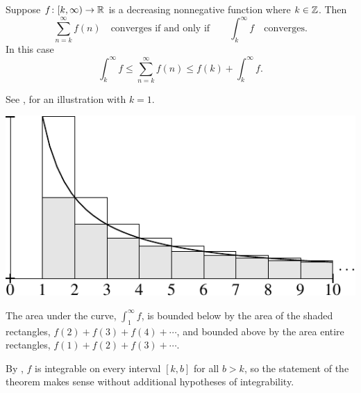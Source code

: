 \begin{prop}
Suppose $f \colon [k,\infty) \to {\mathbb{R}}$ is a decreasing nonnegative
function where $k \in {\mathbb{Z}}$.  Then
\begin{equation*}
\sum_{n=k}^\infty f(n)
\quad \text{converges if and only if}
\qquad
\int_k^\infty f
\quad \text{converges}.
\end{equation*}
In this case 
\begin{equation*}
\int_k^\infty f
\leq
\sum_{n=k}^\infty f(n)
\leq
f(k)+
\int_k^\infty f .
\end{equation*}
\end{prop}
See , for an illustration with $k=1$.
\begin{myfigureht}
\includegraphics{figures/integraltest}
\caption{The area under the curve, 
$\int_1^\infty f$, is bounded below
by the area of the shaded rectangles,
$f(2)+f(3)+f(4)+\cdots$, and bounded above
by the area entire rectangles,
$f(1)+f(2)+f(3)+\cdots$.\label{fig:integraltest}}
\end{myfigureht}
By ,
$f$ is integrable
on every interval $[k,b]$ for all $b > k$, so the statement of the theorem
makes sense without additional hypotheses of integrability.

